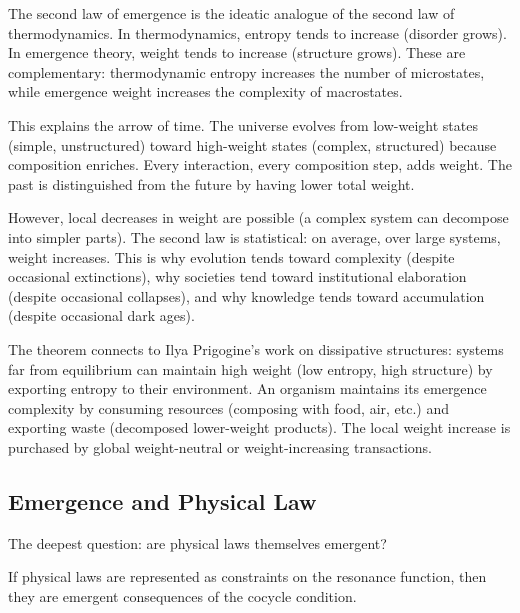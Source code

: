 \begin{interpretation}
The second law of emergence is the ideatic analogue of the second law of
thermodynamics. In thermodynamics, entropy tends to increase (disorder grows).
In emergence theory, weight tends to increase (structure grows). These are
complementary: thermodynamic entropy increases the number of microstates, while
emergence weight increases the complexity of macrostates.

This explains the arrow of time. The universe evolves from low-weight states
(simple, unstructured) toward high-weight states (complex, structured) because
composition enriches. Every interaction, every composition step, adds weight.
The past is distinguished from the future by having lower total weight.

However, local decreases in weight are possible (a complex system can decompose
into simpler parts). The second law is statistical: on average, over large
systems, weight increases. This is why evolution tends toward complexity (despite
occasional extinctions), why societies tend toward institutional elaboration
(despite occasional collapses), and why knowledge tends toward accumulation
(despite occasional dark ages).

The theorem connects to Ilya Prigogine's work on dissipative structures: systems
far from equilibrium can maintain high weight (low entropy, high structure) by
exporting entropy to their environment. An organism maintains its emergence
complexity by consuming resources (composing with food, air, etc.) and exporting
waste (decomposed lower-weight products). The local weight increase is purchased
by global weight-neutral or weight-increasing transactions.
\end{interpretation}

\subsection{Emergence and Physical Law}

The deepest question: are physical laws themselves emergent?

\begin{theorem}
\label{thm:law-emergence}
If physical laws are represented as constraints on the resonance function, then
they are emergent consequences of the cocycle condition.
\end{theorem}


